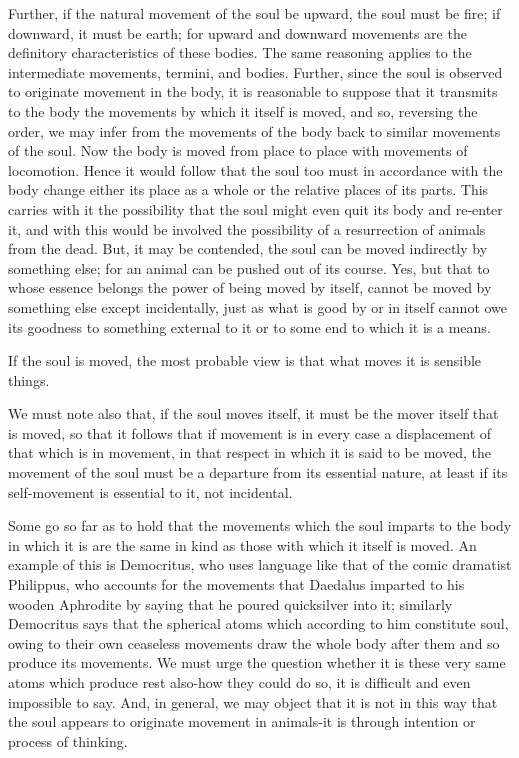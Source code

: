 Further, if the natural movement of the soul be upward, the soul must
be fire; if downward, it must be earth; for upward and downward movements
are the definitory characteristics of these bodies. The same reasoning
applies to the intermediate movements, termini, and bodies. Further,
since the soul is observed to originate movement in the body, it is
reasonable to suppose that it transmits to the body the movements
by which it itself is moved, and so, reversing the order, we may infer
from the movements of the body back to similar movements of the soul.
Now the body is moved from place to place with movements of locomotion.
Hence it would follow that the soul too must in accordance with the
body change either its place as a whole or the relative places of
its parts. This carries with it the possibility that the soul might
even quit its body and re-enter it, and with this would be involved
the possibility of a resurrection of animals from the dead. But, it
may be contended, the soul can be moved indirectly by something else;
for an animal can be pushed out of its course. Yes, but that to whose
essence belongs the power of being moved by itself, cannot be moved
by something else except incidentally, just as what is good by or
in itself cannot owe its goodness to something external to it or to
some end to which it is a means. 

If the soul is moved, the most probable view is that what moves it
is sensible things. 

We must note also that, if the soul moves itself, it must be the mover
itself that is moved, so that it follows that if movement is in every
case a displacement of that which is in movement, in that respect
in which it is said to be moved, the movement of the soul must be
a departure from its essential nature, at least if its self-movement
is essential to it, not incidental. 

Some go so far as to hold that the movements which the soul imparts
to the body in which it is are the same in kind as those with which
it itself is moved. An example of this is Democritus, who uses language
like that of the comic dramatist Philippus, who accounts for the movements
that Daedalus imparted to his wooden Aphrodite by saying that he poured
quicksilver into it; similarly Democritus says that the spherical
atoms which according to him constitute soul, owing to their own ceaseless
movements draw the whole body after them and so produce its movements.
We must urge the question whether it is these very same atoms which
produce rest also-how they could do so, it is difficult and even impossible
to say. And, in general, we may object that it is not in this way
that the soul appears to originate movement in animals-it is through
intention or process of thinking. 

